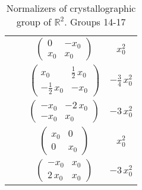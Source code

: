 \documentclass[a4paper,12pt]{amsart}
\theoremstyle{definition}
\begin{document}
\begin{table}[H]
\begin{tabular}{|c|c|c|c|}
		&  & $\left(\begin{array}{rr}
			0 & -x_{0} \\
			x_{0} & x_{0}
		\end{array}\right)$ & $x_{0}^{2}$ \\
		&  & $\left(\begin{array}{rr}
			x_{0} & \frac{1}{2} \, x_{0} \\
			-\frac{1}{2} \, x_{0} & -x_{0}
		\end{array}\right)$ & $-\frac{3}{4} \, x_{0}^{2}$ \\
		&  & $\left(\begin{array}{rr}
			-x_{0} & -2 \, x_{0} \\
			-x_{0} & x_{0}
		\end{array}\right)$ & $-3 \, x_{0}^{2}$ \\
		&  & $\left(\begin{array}{rr}
			x_{0} & 0 \\
			0 & x_{0}
		\end{array}\right)$ & $x_{0}^{2}$ \\
		&  & $\left(\begin{array}{rr}
			-x_{0} & x_{0} \\
			2 \, x_{0} & x_{0}
		\end{array}\right)$ & $-3 \, x_{0}^{2}$ \\
		\hline
	\end{tabular}
	\caption{Normalizers of crystallographic group of $\mathbb{R}^2$. Groups 14-17}
	\end{table}
	
\end{document}
